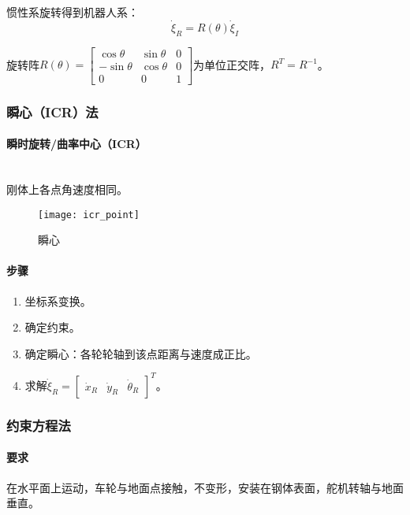 \documentclass[
12pt, %
a4paper, 
oneside, %
headinclude,footinclude, %
]{scrartcl}
\begin{document}
惯性系旋转得到机器人系：
$$ \dot{\xi}_R = R(\theta) \dot{\xi}_I $$

旋转阵$ R(\theta) = \begin{bmatrix} \cos\theta & \sin\theta & 0 \\ -\sin\theta & \cos\theta & 0 \\ 0 & 0 & 1 \end{bmatrix} $为单位正交阵，$ R^T = R^{-1} $。
\subsubsection[瞬心法]{瞬心（ICR）法}
\noindent
\begin{minipage}{0.4\textwidth}
\paragraph{瞬时旋转/曲率中心（ICR）}~\\
\hspace{2em}
刚体上各点角速度相同。
\begin{figure}[H]
\centering 
\texttt{[image: icr\_point]} 
\caption{瞬心}
\end{figure}
\end{minipage}
\begin{minipage}{0.6\textwidth}
\paragraph{步骤}
\begin{enumerate}
\item 坐标系变换。
\item 确定约束。
\item 确定瞬心：各轮轮轴到该点距离与速度成正比。
\item 求解$ \dot{\xi}_R = \begin{bmatrix} \dot{x}_R & \dot{y}_R & \dot{\theta}_R \end{bmatrix}^T $。
\end{enumerate}
\end{minipage}
\subsubsection[约束方程法]{约束方程法}
\paragraph{要求}
在水平面上运动，车轮与地面点接触，不变形，安装在钢体表面，舵机转轴与地面垂直。
\end{document}
